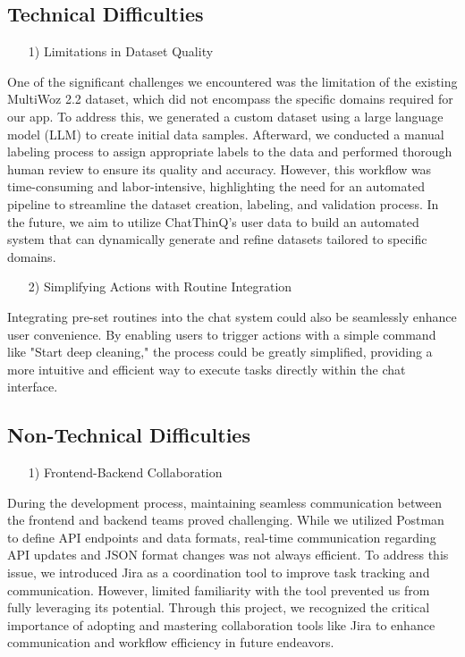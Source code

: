 \documentclass[conference]{IEEEtran}
\begin{document}
\subsection{Technical Difficulties}
\begin{enumerate}
    \item [1)] Limitations in Dataset Quality 
\end{enumerate}
    \hspace{0.3em} 
One of the significant challenges we encountered was the limitation of the existing MultiWoz 2.2 dataset, which did not encompass the specific domains required for our app. To address this, we generated a custom dataset using a large language model (LLM) to create initial data samples. Afterward, we conducted a manual labeling process to assign appropriate labels to the data and performed thorough human review to ensure its quality and accuracy. However, this workflow was time-consuming and labor-intensive, highlighting the need for an automated pipeline to streamline the dataset creation, labeling, and validation process. In the future, we aim to utilize ChatThinQ's user data to build an automated system that can dynamically generate and refine datasets tailored to specific domains. \\
\begin{enumerate}
    \item [2)]  Simplifying Actions with Routine Integration
\end{enumerate}
    \hspace{0.3em} Integrating pre-set routines into the chat system could also be seamlessly enhance user convenience. By enabling users to trigger actions with a simple command like "Start deep cleaning," the process could be greatly simplified, providing a more intuitive and efficient way to execute tasks directly within the chat interface. \\

\subsection{Non-Technical Difficulties}
\begin{enumerate}
    \item [1)] Frontend-Backend Collaboration
\end{enumerate}
    \hspace{0.3em} During the development process, maintaining seamless communication between the frontend and backend teams proved challenging. While we utilized Postman to define API endpoints and data formats, real-time communication regarding API updates and JSON format changes was not always efficient. To address this issue, we introduced Jira as a coordination tool to improve task tracking and communication. However, limited familiarity with the tool prevented us from fully leveraging its potential. Through this project, we recognized the critical importance of adopting and mastering collaboration tools like Jira to enhance communication and workflow efficiency in future endeavors. \\ 
\end{document}
